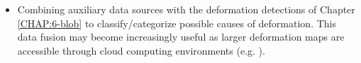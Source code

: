 \begin{itemize}
\item Combining auxiliary data sources with the deformation detections of Chapter \ref{CHAP:6-blob} to classify/categorize possible causes of deformation. This data fusion may become increasingly useful as larger deformation maps are accessible through cloud computing environments (e.g. \cite{Kellndorfer2022GlobalSeasonalSentinel}).


\end{itemize}

